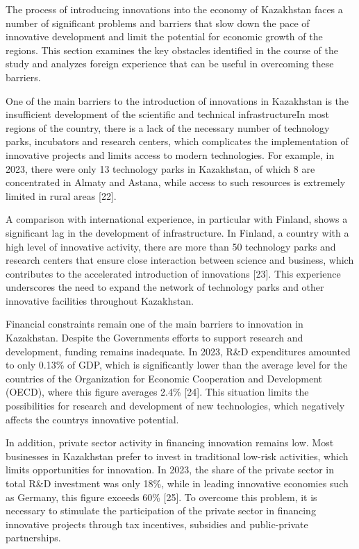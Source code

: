 \begin{multicols}{2}
The process of introducing innovations into the economy of Kazakhstan
faces a number of significant problems and barriers that slow down the
pace of innovative development and limit the potential for economic
growth of the regions. This section examines the key obstacles
identified in the course of the study and analyzes foreign experience
that can be useful in overcoming these barriers.

One of the main barriers to the introduction of innovations in
Kazakhstan is the insufficient development of the scientific and
technical infrastructureIn most regions of the country, there is a lack
of the necessary number of technology parks, incubators and research
centers, which complicates the implementation of innovative projects and
limits access to modern technologies. For example, in 2023, there were
only 13 technology parks in Kazakhstan, of which 8 are concentrated in
Almaty and Astana, while access to such resources is extremely limited
in rural areas {[}22{]}.

A comparison with international experience, in particular with Finland,
shows a significant lag in the development of infrastructure. In
Finland, a country with a high level of innovative activity, there are
more than 50 technology parks and research centers that ensure close
interaction between science and business, which contributes to the
accelerated introduction of innovations {[}23{]}. This experience
underscores the need to expand the network of technology parks and other
innovative facilities throughout Kazakhstan.

Financial constraints remain one of the main barriers to innovation in
Kazakhstan. Despite the Government\textquotesingle s efforts to support
research and development, funding remains inadequate. In 2023, R\&D
expenditures amounted to only 0.13\% of GDP, which is significantly
lower than the average level for the countries of the Organization for
Economic Cooperation and Development (OECD), where this figure averages
2.4\% {[}24{]}. This situation limits the possibilities for research and
development of new technologies, which negatively affects the
country\textquotesingle s innovative potential.

In addition, private sector activity in financing innovation remains
low. Most businesses in Kazakhstan prefer to invest in traditional
low-risk activities, which limits opportunities for innovation. In 2023,
the share of the private sector in total R\&D investment was only 18\%,
while in leading innovative economies such as Germany, this figure
exceeds 60\% {[}25{]}. To overcome this problem, it is necessary to
stimulate the participation of the private sector in financing
innovative projects through tax incentives, subsidies and public-private
partnerships.


\end{multicols}
